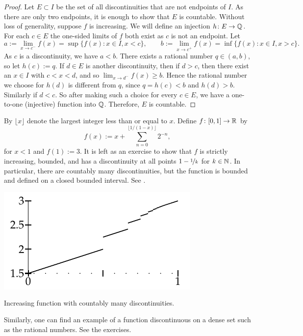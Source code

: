 \begin{proof}
Let $E \subset I$ be the set of all discontinuities
that are not endpoints of $I$.  As there are
only two endpoints, it is enough to show that $E$ is countable.
Without loss of generality, suppose $f$ is increasing.
We will define an injection $h \colon E \to {\mathbb{Q}}$.
For each $c \in E$
the one-sided limits of $f$ both exist as $c$ is not an endpoint.
Let
\begin{equation*}
a := \lim_{x \to c^-} f(x) = \sup \bigl\{ f(x) : x \in I, x < c \bigr\} ,
\qquad
b := \lim_{x \to c^+} f(x) = \inf \bigl\{ f(x) : x \in I, x > c \bigr\} .
\end{equation*}
As $c$ is a discontinuity, we have $a < b$.  
There exists a rational number $q \in (a,b)$, so let $h(c) := q$.
If $d \in E$ is another discontinuity, then if $d > c$, then there
exist an $x \in I$ with $c < x < d$, and so $\lim_{x \to d^-} f(x) \geq b$.
Hence the rational number we choose for $h(d)$ is different from $q$,
since $q=h(c) < b$ and $h(d) > b$.
Similarly if $d < c$.  So after making such a choice for
every $c \in E$, we have a 
one-to-one (injective) function into ${\mathbb{Q}}$.  Therefore, $E$ is countable.
\end{proof}

\begin{example} \label{example:countdiscont}
By $\lfloor x \rfloor$ denote the largest integer less than or equal to $x$.
Define $f \colon [0,1] \to {\mathbb{R}}$ by
\begin{equation*}
f(x) :=
x +
\sum_{n=0}^{\lfloor 1/(1-x) \rfloor}
2^{-n} ,
\end{equation*}
for $x < 1$ and $f(1) := 3$.
It is left as an exercise to show that $f$ is strictly increasing, bounded, and
has a discontinuity at all points $1-\nicefrac{1}{k}$ for $k \in {\mathbb{N}}$.  In particular,
there are countably many discontinuities, but the function is bounded and
defined on a closed bounded interval.  See .
\begin{myfigureht}
\includegraphics{figures/increasing-discont-fig}
\caption{Increasing function with countably many
discontinuities.\label{fig:countdiscont}}
\end{myfigureht}

Similarly, one can find an example of a function discontinuous on a dense set
such as the rational numbers.  See the exercises.
\end{example}


